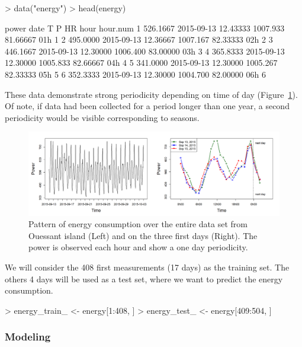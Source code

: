 \begin{example}
> data("energy")
> head(energy)
\end{example}
\begin{example}
     power       date        T        P       HR hour hour.num
1 526.1667 2015-09-13 12.43333 1007.933 81.66667  01h        1
2 495.0000 2015-09-13 12.36667 1007.167 82.33333  02h        2
3 446.1667 2015-09-13 12.30000 1006.400 83.00000  03h        3
4 365.8333 2015-09-13 12.30000 1005.833 82.66667  04h        4
5 341.0000 2015-09-13 12.30000 1005.267 82.33333  05h        5
6 352.3333 2015-09-13 12.30000 1004.700 82.00000  06h        6
\end{example}


These data demonstrate strong periodicity depending on time of day (Figure~\ref{fig:energy_Figure1}). Of note, if data had been collected for a period longer than one year, a second periodicity would be visible corresponding to seasons.


\begin{figure}[htbp]
\centering
\includegraphics[width=\textwidth]{figure4}
\caption{\label{fig:energy_Figure1} Pattern of energy consumption over the entire data set from Ouessant island (Left) and on the three first days (Right). The power is observed each hour and show a one day periodicity.} 
\end{figure}

We will consider the 408 first measurements (17 days) as the training set. The others 4 days will be used as a test set, where we want to predict the energy consumption. 


\begin{example}
> energy_train_ <- energy[1:408, ]
> energy_test_ <- energy[409:504, ]
\end{example}


\subsubsection{Modeling} \label{sec:illustrations-energy-model1}


